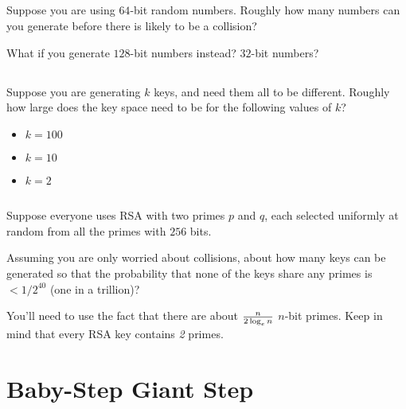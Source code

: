 \documentclass[12pt]{article}
\begin{document}
\subsection{}

Suppose you are using $64$-bit random numbers. Roughly how many numbers can you generate before there is likely to be a collision?

What if you generate $128$-bit numbers instead? $32$-bit numbers?


\subsection{}

Suppose you are generating $k$ keys, and need them all to be different. Roughly how large does the key space need to be for the following values of $k$?

\begin{itemize}
\item $k = 100$
\item $k = 10$
\item $k = 2$
\end{itemize}


\subsection{}

Suppose everyone uses RSA with two primes $p$ and $q$, each selected uniformly at random from all the primes with $256$ bits.

Assuming you are only worried about collisions, about how many keys can be generated so that the probability that none of the keys share any primes is $< 1 / 2^{40}$ (one in a trillion)?

You'll need to use the fact that there are about ${n \over 2 \log_e n}$ $n$-bit primes. Keep in mind that every RSA key contains \emph{2} primes.




\section{Baby-Step Giant Step}
\end{document}
